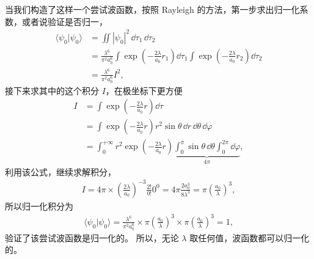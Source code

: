 当我们构造了这样一个尝试波函数，按照 Rayleigh 的方法，第一步求出归一化系数，或者说验证是否归一，
\begin{align}
    \langle \psi_0 | \psi_0 \rangle &= \iint |\psi_0|^2 \,\dd\tau_1\,\dd\tau_2 \\
    &= \frac{\lambda^6}{\pi^2a_0^6} 
    \int \exp\!\left(-\frac{2\lambda}{a_0}r_1\right)\dd\tau_1 
    \int \exp\!\left(-\frac{2\lambda}{a_0}r_2\right)\dd\tau_2 
    \\
    &= \frac{\lambda^6}{\pi^2a_0^6} I^2,
\end{align}
接下来求其中的这个积分 $I$，在极坐标下更方便
\begin{align}
    I &= \int \exp\left(- \frac{2\lambda}{a_0} r\right) \dd\tau \\
    &= \int \exp\left(- \frac{2\lambda}{a_0} r\right) r^2 \sin\theta\,\dd r\,\dd\theta\,\dd\varphi \\
    &= \int_0^{+\infty} r^2 \exp\left(- \frac{2\lambda}{a_0} r\right) 
    \underbrace{\int_0^\pi \sin\theta\,\dd\theta \int_0^{2\pi} \dd\varphi}_{4\pi},
\end{align}
利用该公式，继续求解积分，
\begin{align}
    I = 4\pi \times \left(\frac{2\lambda}{a_0}\right)^{-3} \frac{2!}{0!} 0^0 = 4\pi \frac{2a_0^3}{8\lambda^3} = \pi\left(\frac{a_0}{\lambda}\right)^3,
\end{align}
所以归一化积分为
\begin{align}
    \langle \psi_0 | \psi_0 \rangle = \frac{\lambda^6}{\pi^2a_0^6} \times \pi\left(\frac{a_0}{\lambda}\right)^3 \times \pi\left(\frac{a_0}{\lambda}\right)^3 = 1,
\end{align}
验证了该尝试波函数是归一化的。
所以，无论 $\lambda$ 取任何值，波函数都可以归一化的。

